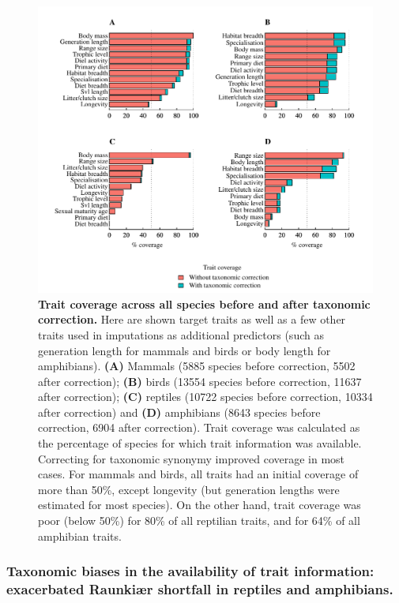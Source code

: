 \begin{figure}[h!]
\centering
\includegraphics[scale=0.85]{figures/chapter2/Trait_coverage/Predictor_traits/All_species}
\caption[Trait coverage across all species before and after taxonomic correction]{\textbf{Trait coverage across all species before and after taxonomic correction.} Here are shown target traits as well as a few other traits used in imputations as additional predictors (such as generation length for mammals and birds or body length for amphibians). \textbf{(A)} Mammals (5885 species before correction, 5502 after correction); \textbf{(B)} birds (13554 species before correction, 11637 after correction); \textbf{(C)} reptiles (10722 species before correction, 10334 after correction) and \textbf{(D)}  amphibians (8643 species before correction, 6904 after correction). Trait coverage was calculated as the percentage of species for which trait information was available. Correcting for taxonomic synonymy improved coverage in most cases. For mammals and birds, all traits had an initial coverage of more than 50\%, except longevity (but generation lengths were estimated for most species). On the other hand, trait coverage was poor (below 50\%) for 80\% of all reptilian traits, and for 64\% of all amphibian traits.}
\label{traitcov}
\end{figure}

\subsubsection{Taxonomic biases in the availability of trait information: exacerbated Raunki{\ae}r shortfall in reptiles and amphibians.}

